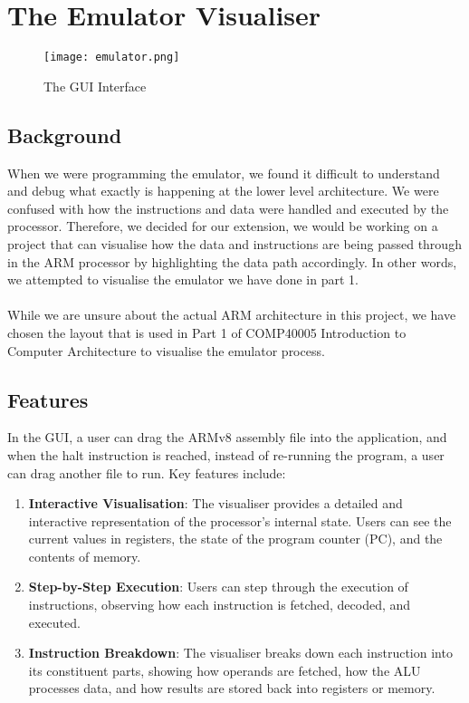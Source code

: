 \documentclass[10pt]{article}
\begin{document}
\section{The Emulator Visualiser}

\begin{figure}
    \centering
    \texttt{[image: emulator.png]}
    \caption{The GUI Interface}
    \label{emulator}
\end{figure}


\subsection{Background}
When we were programming the emulator, we found it difficult to understand and debug what exactly is happening at the lower level architecture. We were confused with how the instructions and data were handled and executed by the processor. Therefore, we decided for our extension, we would be working on a project that can visualise how the data and instructions are being passed through in the ARM processor by highlighting the data path accordingly. In other words, we attempted to visualise the emulator we have done in part 1. \\
\\
While we are unsure about the actual ARM architecture in this project, we have chosen the layout that is used in Part 1 of COMP40005 Introduction to Computer Architecture to visualise the emulator process.

\subsection{Features}
In the GUI, a user can drag the ARMv8 assembly file into the application, and when the halt instruction is reached, instead of re-running the program, a user can drag another file to run. Key features include:
\begin{enumerate}
\item \textbf{Interactive Visualisation}: The visualiser provides a detailed and interactive representation of the processor's internal state. Users can see the current values in registers, the state of the program counter (PC), and the contents of memory.
\item \textbf{Step-by-Step Execution}: Users can step through the execution of instructions, observing how each instruction is fetched, decoded, and executed.
\item \textbf{Instruction Breakdown}: The visualiser breaks down each instruction into its constituent parts, showing how operands are fetched, how the ALU processes data, and how results are stored back into registers or memory.
\end{enumerate}
\end{document}
